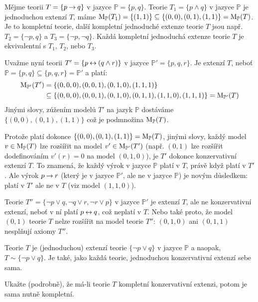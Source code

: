 \begin{example}
Mějme teorii $T=\{p\mathbin{\rightarrow} q\}$ v jazyce $\mathbb P=\{p,q\}$. Teorie $T_1=\{p\land q\}$ v jazyce $\mathbb P$ je jednoduchou extenzí $T$, máme $\operatorname{M}_\mathbb P(T_1)=\{(1,1)\}\subseteq\{(0,0),(0,1),(1,1)\}=\operatorname{M}_\mathbb P(T)$. Je to kompletní teorie, další kompletní jednoduché extenze teorie $T$ jsou např.\ $T_2=\{\neg p,q\}$ a $T_3=\{\neg p,\neg q\}$. Každá kompletní jednoduchá extenze teorie $T$ je ekvivalentní s $T_1$, $T_2$, nebo $T_3$.

Uvažme nyní teorii $T'=\{p\mathbin{\leftrightarrow} (q\land r)\}$ v jazyce $\mathbb P'=\{p,q,r\}$. Je extenzí $T$, neboť $\mathbb P=\{p,q\}\subseteq\{p,q,r\}=\mathbb P'$ a platí:
\begin{align*}
    \operatorname{M}_{\mathbb P'}(T')&=\{(0,0,0),(0,0,1),(0,1,0),(1,1,1)\}\\
    &\subseteq\{(0,0,0),(0,0,1),(0,1,0),(0,1,1),(1,1,0),(1,1,1)\}=\operatorname{M}_{\mathbb P'}(T)
\end{align*}
Jinými slovy, zúžením modelů $T'$ na jazyk $\mathbb P$ dostáváme $\{(0,0),(0,1),(1,1)\}$ což je podmnožina $\operatorname{M}_\mathbb P(T)$.

Protože platí dokonce $\{(0,0),(0,1),(1,1)\}=\operatorname{M}_\mathbb P(T)$, jinými slovy, každý model $v\in\operatorname{M}_\mathbb P(T)$ lze rozšířit na model $v'\in\operatorname{M}_{\mathbb P'}(T')$ (např. $(0,1)$ lze rozšířit dodefinováním $v'(r)=0$ na model $(0,1,0)$), je $T'$ dokonce konzervativní extenzí $T$. To znamená, že každý výrok v jazyce $\mathbb P$ platí v $T$, právě když platí v $T'$. Ale výrok $p\mathbin{\rightarrow} r$ (který je v jazyce $\mathbb P'$, ale ne v jazyce $\mathbb P$) je novým důsledkem: platí v $T'$ ale ne v $T$ (viz model $(1,1,0)$).

Teorie $T''=\{\neg p\lor q,\neg q\lor r,\neg r\lor p\}$ v jazyce $\mathbb P'$ je extenzí $T$, ale ne konzervativní extenzí, neboť v ní platí $p\mathbin{\leftrightarrow} q$, což neplatí v $T$. Nebo také proto, že model $(0, 1)$ teorie $T$ nelze rozšířit na model teorie $T''$: $(0,1,0)$ ani $(0,1,1)$ nesplňují axiomy $T''$.

Teorie $T$ je (jednoduchou) extenzí teorie $\{\neg p\lor q\}$ v jazyce $\mathbb P$ a naopak, $T\sim\{\neg p\lor q\}$. Je také, jako každá teorie, jednoduchou konzervativní extenzí sebe sama.
\end{example}

\begin{exercise}
    Ukažte (podrobně), že má-li teorie $T$ kompletní konzervativní extenzi, potom je sama nutně kompletní.
\end{exercise}

